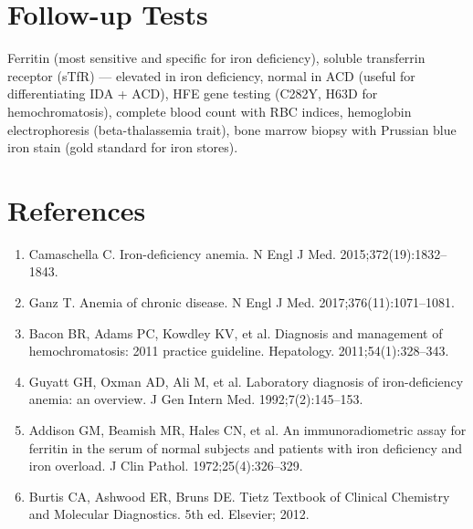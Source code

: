 \section*{Follow-up Tests}
Ferritin (most sensitive and specific for iron deficiency), soluble transferrin receptor (sTfR) --- elevated in iron deficiency, normal in ACD (useful for differentiating IDA + ACD), HFE gene testing (C282Y, H63D for hemochromatosis), complete blood count with RBC indices, hemoglobin electrophoresis (beta-thalassemia trait), bone marrow biopsy with Prussian blue iron stain (gold standard for iron stores).
\section*{References}
\begin{enumerate}
  \item Camaschella C. Iron-deficiency anemia. N Engl J Med. 2015;372(19):1832--1843.
  \item Ganz T. Anemia of chronic disease. N Engl J Med. 2017;376(11):1071--1081.
  \item Bacon BR, Adams PC, Kowdley KV, et al. Diagnosis and management of hemochromatosis: 2011 practice guideline. Hepatology. 2011;54(1):328--343.
  \item Guyatt GH, Oxman AD, Ali M, et al. Laboratory diagnosis of iron-deficiency anemia: an overview. J Gen Intern Med. 1992;7(2):145--153.
  \item Addison GM, Beamish MR, Hales CN, et al. An immunoradiometric assay for ferritin in the serum of normal subjects and patients with iron deficiency and iron overload. J Clin Pathol. 1972;25(4):326--329.
  \item Burtis CA, Ashwood ER, Bruns DE. Tietz Textbook of Clinical Chemistry and Molecular Diagnostics. 5th ed. Elsevier; 2012.
\end{enumerate}
\clearpage
